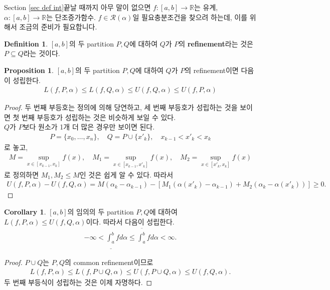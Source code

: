 \documentclass[12pt]{article}
\theoremstyle{definition}
\newtheorem{cor}[thm]{Corollary}
\newtheorem{prop}[thm]{Proposition}
\newtheorem{defn}[thm]{Definition}
\def\RR{\mathbb{R}}
\def\calR{\mathcal{R}}
\begin{document}
Section \ref{sec def int}\가 끝날 때까지 아무 말이 없으면 \(f: [a, b] \rightarrow \RR\)는 유계, \(\alpha: [a, b] \rightarrow \RR\)는 단조증가함수. \(f \in \calR(\alpha)\)일 필요충분조건을 찾으려 하는데, 이를 위해서 조금의 준비가 필요합니다. 

\begin{defn}
	\([a, b]\)의 두 partition \(P, Q\)에 대하여 \(Q\)가 \(P\)의 \textbf{refinement}라는 것은 \(P \subseteq Q\)라는 것이다.
\end{defn}

\begin{prop} \label{prop refinement}
	\([a, b]\)의 두 partition \(P, Q\)에 대하여 \(Q\)가 \(P\)의 refinement이면 다음이 성립한다.
	\begin{gather*}
		L(f, P, \alpha) \le L(f, Q, \alpha) \le U(f, Q, \alpha) \le U(f, P, \alpha)
	\end{gather*}
\end{prop}
\begin{proof}
	두 번째 부등호는 정의에 의해 당연하고, 세 번째 부등호가 성립하는 것을 보이면 첫 번째 부등호가 성립하는 것은 비슷하게 보일 수 있다.\\
	\(Q\)가 \(P\)보다 원소가 1개 더 많은 경우만 보이면 된다. 
	\begin{gather*}
		P = \{x_0, \ldots, x_n\}, \quad Q = P \cup \{x'_k\}, \quad x_{k-1} < x'_k < x_k
	\end{gather*}
	로 놓고,
	\begin{gather*}
		M = \sup_{x \in [x_{k-1}, x_k]} f(x), \quad M_1 = \sup_{x \in [x_{k-1}, x'_k]} f(x), \quad M_2 = \sup_{x \in [x'_k, x_k]} f(x)
	\end{gather*}
	로 정의하면 \(M_1, M_2 \le M\)인 것은 쉽게 알 수 있다. 따라서
	\begin{gather*}
		U(f, P, \alpha) - U(f, Q, \alpha) = M(\alpha_k - \alpha_{k-1}) - [M_1(\alpha(x'_k) - \alpha_{k-1}) + M_2 (\alpha_k - \alpha(x'_k))] \ge 0.
	\end{gather*}
\end{proof}

\begin{cor} \label{cor int welldef}
	\([a, b]\)의 임의의 두 partition \(P, Q\)에 대하여 \(L(f, P, \alpha) \le U(f, Q, \alpha)\)이다. 따라서 다음이 성립한다.
	\begin{gather*}
		-\infty < \underline{\int_a^b} f d\alpha \le \overline{\int_a^b} f d\alpha < \infty.
	\end{gather*}
\end{cor}
\begin{proof}
	\(P \cup Q\)는 \(P, Q\)의 common refinement이므로
	\begin{gather*}
		L(f, P, \alpha) \le L(f, P \cup Q, \alpha) \le U(f, P \cup Q, \alpha) \le U(f, Q, \alpha).
	\end{gather*}
	두 번째 부등식이 성립하는 것은 이제 자명하다.
\end{proof}
\end{document}
